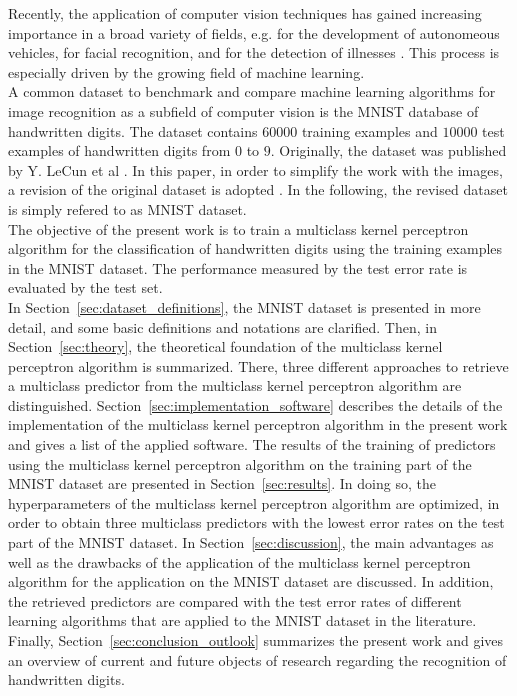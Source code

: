 Recently, the application of computer vision techniques has gained increasing importance in a broad variety of fields, e.g. for the development of autonomeous vehicles, for facial recognition, and for the detection of illnesses \cite{autonomeous2020, emotion2020, medicine2021}. This process is especially driven by the growing field of machine learning. \\

A common dataset to benchmark and compare machine learning algorithms for image recognition as a subfield of computer vision is the MNIST database of handwritten digits. The dataset contains $60000$ training examples and $10000$ test examples of handwritten digits from $0$ to $9$. Originally, the dataset was published by Y. LeCun et al \cite{MNIST}. In this paper, in order to simplify the work with the images, a revision of the original dataset is adopted \cite{KaggleData}. In the following, the revised dataset is simply refered to as MNIST dataset. \\

The objective of the present work is to train a multiclass kernel perceptron algorithm for the classification of handwritten digits using the training examples in the MNIST dataset. The performance measured by the test error rate is evaluated by the test set.\\

In Section~\ref{sec:dataset_definitions}, the MNIST dataset is presented in more detail, and some basic definitions and notations are clarified. Then, in Section~\ref{sec:theory}, the theoretical foundation of the multiclass kernel perceptron algorithm is summarized. There, three different approaches to retrieve a multiclass predictor from the multiclass kernel perceptron algorithm are distinguished. Section~\ref{sec:implementation_software} describes the details of the implementation of the multiclass kernel perceptron algorithm in the present work and gives a list of the applied software. The results of the training of predictors using the multiclass kernel perceptron algorithm on the training part of the MNIST dataset are presented in Section~\ref{sec:results}. In doing so, the hyperparameters of the multiclass kernel perceptron algorithm are optimized, in order to obtain three multiclass predictors with the lowest error rates on the test part of the MNIST dataset. In Section~\ref{sec:discussion}, the main advantages as well as the drawbacks of the application of the multiclass kernel perceptron algorithm for the application on the MNIST dataset are discussed. In addition, the retrieved predictors are compared with the test error rates of different learning algorithms that are applied to the MNIST dataset in the literature. Finally, Section~\ref{sec:conclusion_outlook} summarizes the present work and gives an overview of current and future objects of research regarding the recognition of handwritten digits.